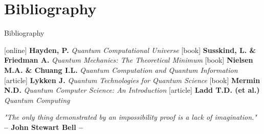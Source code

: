\documentclass[9pt, handout, aspectratio=169]{beamer}	%
\begin{document}
\section{Bibliography}
\begin{frame}{Bibliography}

	\begin{thebibliography}{9}
		[online]
	 \textbf{Hayden, P.} \emph{Quantum Computational Universe}
	 \textbf{Susskind, L. \& Friedman A.} \emph{Quantum Mechanics: The Theoretical Minimum}
	 \textbf{Nielsen M.A. \& Chuang I.L.} \emph{Quantum Computation and Quantum Information}
		[article]
	 \textbf{Lykken J.} \emph{Quantum Technologies for Quantum Science}
	 \textbf{Mermin N.D.} \emph{Quantum Computer Science: An Introduction}
		[article]
	 \textbf{Ladd T.D. (et al.)} \emph{Quantum Computing}

	\end{thebibliography}

	\vspace{20pt}
	\begin{small}
	\begin{center}{
	\color{gray}
		\emph{"The only thing demonstrated by an impossibility proof is a lack of imagination."} \\
		\textbf{– John Stewart Bell –} }
	\end{center}
	\end{small}
\end{frame}

\FinalFrame
\end{document}
